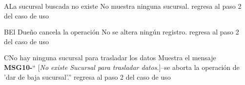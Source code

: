 \begin{UCtrayectoriaA}{A}{La sucursal buscada no existe}
			\UCpaso No muestra ninguna sucursal.
			\UCpaso regresa al paso 2 del caso de uso 
		\end{UCtrayectoriaA}
\begin{UCtrayectoriaA}{B}{El Dueño cancela la operación}
			\UCpaso No se altera ningún registro.
			\UCpaso regresa al paso 2 del caso de uso 
		\end{UCtrayectoriaA}		
\begin{UCtrayectoriaA}{C}{No hay ninguna sucursal para trasladar los datos}
			\UCpaso Muestra el mensaje {\bf MSG10-}`` [{\em No existe Sucursal para trasladar datos.}]--se aborta la operación de 'dar de baja sucursal'.''
			\UCpaso regresa al paso 2 del caso de uso 
		\end{UCtrayectoriaA}		


